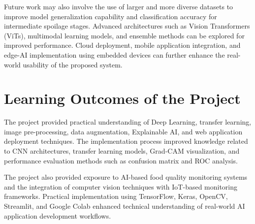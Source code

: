 Future work may also involve the use of larger and more diverse datasets to improve model generalization capability and classification accuracy for intermediate spoilage stages. Advanced architectures such as Vision Transformers (ViTs), multimodal learning models, and ensemble methods can be explored for improved performance. Cloud deployment, mobile application integration, and edge-AI implementation using embedded devices can further enhance the real-world usability of the proposed system.

\section[Learning Outcomes of the Project]{\textbf{Learning Outcomes of the Project}}
The project provided practical understanding of Deep Learning, transfer learning, image pre-processing, data augmentation, Explainable AI, and web application deployment techniques. The implementation process improved knowledge related to CNN architectures, transfer learning models, Grad-CAM visualization, and performance evaluation methods such as confusion matrix and ROC analysis.

The project also provided exposure to AI-based food quality monitoring systems and the integration of computer vision techniques with IoT-based monitoring frameworks. Practical implementation using TensorFlow, Keras, OpenCV, Streamlit, and Google Colab enhanced technical understanding of real-world AI application development workflows.
